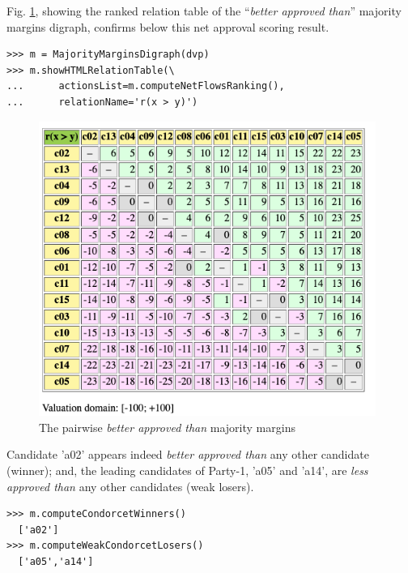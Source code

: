 Fig. \ref{fig:20.4}, showing the \NetFlows ranked relation table of the ``\emph{better approved than}'' majority margins digraph, confirms below this net approval scoring result.
\begin{lstlisting}
>>> m = MajorityMarginsDigraph(dvp)
>>> m.showHTMLRelationTable(\
...      actionsList=m.computeNetFlowsRanking(),
...      relationName='r(x > y)')
\end{lstlisting}	   
\begin{figure}[h]
\includegraphics[width=11cm]{Figures/20-4-majMargDAV.png}
\caption{The pairwise \emph{better approved than} majority margins} 
\label{fig:20.4}       %
\end{figure}
Candidate 'a02' appears indeed \emph{better approved than} any other candidate (\Condorcet winner); and, the leading candidates of Party-1, 'a05' and 'a14', are \emph{less approved than} any other candidates (weak \Condorcet losers).
\begin{lstlisting}
>>> m.computeCondorcetWinners()
  ['a02']
>>> m.computeWeakCondorcetLosers()
  ['a05','a14']
\end{lstlisting}

